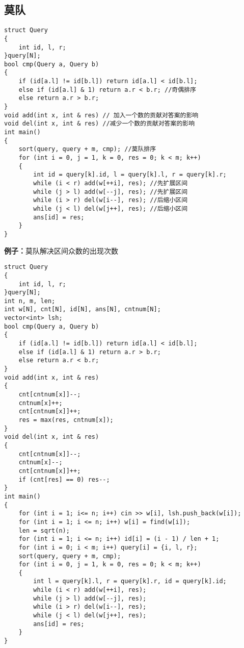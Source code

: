 \documentclass[a4paper, fontset=none]{ctexart}
\begin{document}
\subsection{莫队}
\begin{verbatim}
struct Query
{
    int id, l, r;
}query[N];
bool cmp(Query a, Query b)
{
    if (id[a.l] != id[b.l]) return id[a.l] < id[b.l];
    else if (id[a.l] & 1) return a.r < b.r; //奇偶排序
    else return a.r > b.r;
}
void add(int x, int & res) // 加入一个数的贡献对答案的影响
void del(int x, int & res) //减少一个数的贡献对答案的影响
int main()
{
    sort(query, query + m, cmp); //莫队排序
    for (int i = 0, j = 1, k = 0, res = 0; k < m; k++)
    {
        int id = query[k].id, l = query[k].l, r = query[k].r;
        while (i < r) add(w[++i], res); //先扩展区间
        while (j > l) add(w[--j], res); //先扩展区间
        while (i > r) del(w[i--], res); //后缩小区间
        while (j < l) del(w[j++], res); //后缩小区间
        ans[id] = res;
    }
}
\end{verbatim}
\textbf{例子：}莫队解决区间众数的出现次数
\begin{verbatim}
struct Query
{
    int id, l, r;
}query[N];
int n, m, len;
int w[N], cnt[N], id[N], ans[N], cntnum[N];
vector<int> lsh;
bool cmp(Query a, Query b)
{
    if (id[a.l] != id[b.l]) return id[a.l] < id[b.l];
    else if (id[a.l] & 1) return a.r > b.r;
    else return a.r < b.r;
}
void add(int x, int & res)
{
    cnt[cntnum[x]]--;
    cntnum[x]++;
    cnt[cntnum[x]]++;
    res = max(res, cntnum[x]);
}
void del(int x, int & res)
{
    cnt[cntnum[x]]--;
    cntnum[x]--;
    cnt[cntnum[x]]++;
    if (cnt[res] == 0) res--;
}
int main()
{
    for (int i = 1; i<= n; i++) cin >> w[i], lsh.push_back(w[i]);
    for (int i = 1; i <= n; i++) w[i] = find(w[i]);
    len = sqrt(n);
    for (int i = 1; i <= n; i++) id[i] = (i - 1) / len + 1;
    for (int i = 0; i < m; i++) query[i] = {i, l, r};
    sort(query, query + m, cmp);
    for (int i = 0, j = 1, k = 0, res = 0; k < m; k++)
    {
        int l = query[k].l, r = query[k].r, id = query[k].id;
        while (i < r) add(w[++i], res);
        while (j > l) add(w[--j], res);
        while (i > r) del(w[i--], res);
        while (j < l) del(w[j++], res);
        ans[id] = res;
    }
}
\end{verbatim}
\end{document}
